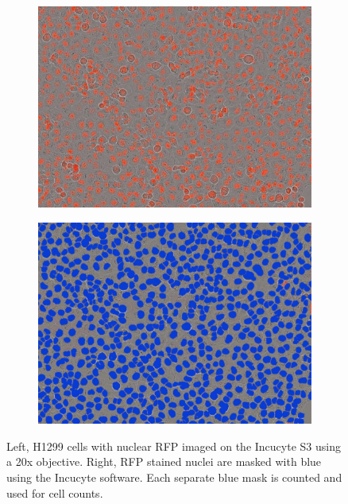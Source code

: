 \begin{figure}[ht]
     \centering
     \begin{subfigure}[b]{0.3\textwidth}
         \includegraphics[width=\textwidth]{figures/sapp/IC/H1299-Nuc_RFP.jpg}
     \end{subfigure}
     \begin{subfigure}[b]{0.3\textwidth}
         \includegraphics[width=\textwidth]{figures/sapp/IC/H1299-Nuc_RFP_count.jpg}
     \end{subfigure}
        \caption[Incucyte RFP nuclei count in H1299.]{
        Left, H1299 cells with nuclear RFP imaged on the Incucyte S3 using a 20x objective.
        Right, RFP stained nuclei are masked with blue using the Incucyte software.
        Each separate blue mask is counted and used for cell counts.
        }
        \label{fig:sapp:IC:H1299_Nuc_RFP_ICimg}
\end{figure}



